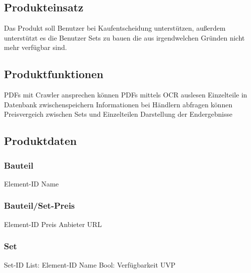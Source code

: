 \subsection{Produkteinsatz}
 Das Produkt soll Benutzer bei Kaufentscheidung unterstützen, außerdem unterstützt es die Benutzer Sets zu bauen die aus irgendwelchen Gründen nicht mehr verfügbar sind.\newline

\subsection{Produktfunktionen}
PDFs mit Crawler ansprechen können \newline
PDFs mittels OCR auslesen \newline
Einzelteile in Datenbank zwischenspeichern \newline
Informationen bei Händlern abfragen können \newline
Preisvergeich zwischen Sets und Einzelteilen \newline
Darstellung der Endergebnisse \newline

\subsection{Produktdaten}

\subsubsection{Bauteil}
Element-ID\newline
Name \newline

\subsubsection{Bauteil/Set-Preis}
Element-ID\newline
Preis\newline
Anbieter\newline
URL\newline

\subsubsection{Set}
Set-ID \newline
List: Element-ID \newline
Name \newline
Bool: Verfügbarkeit \newline
UVP \newline

